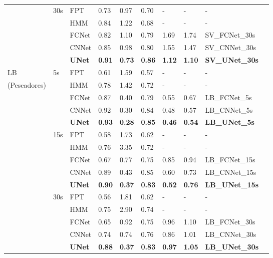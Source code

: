 \documentclass{article}
\begin{document}
\begin{table}[h]
\begin{tabular}{llllllllll}
             & 30s & FPT    & 0.73 & 0.97 & 0.70 &  - & - & - \\
             &     & HMM    & 0.84 & 1.22 & 0.68 & - & - & - \\
             &     & FCNet  & 0.82 & 1.10 & 0.79 & 1.69 & 1.74 & SV\_FCNet\_30s \\
             &     & CNNet  & 0.85 & 0.98 & 0.80 & 1.55 & 1.47 & SV\_CNNet\_30s \\
             &     & {\bf UNet} & {\bf 0.91} & {\bf 0.73} & {\bf 0.86} & {\bf 1.12} & {\bf 1.10} & {\bf SV\_UNet\_30s} \\
    \midrule
    LB        & 5s  & FPT    & 0.61 & 1.59 & 0.57 & - & - & - \\
(Pescadores) &     & HMM    & 0.78 & 1.42 & 0.72 & - & - & - \\
             &     & FCNet  & 0.87 & 0.40 & 0.79 & 0.55 & 0.67 & LB\_FCNet\_5s \\
             &     & CNNet  & 0.92 & 0.30 & 0.84 & 0.48 & 0.57 & LB\_CNNet\_5s \\
             &     & {\bf UNet} & {\bf 0.93} & {\bf 0.28} & {\bf 0.85} & {\bf 0.46} & {\bf 0.54} & {\bf LB\_UNet\_5s} \\
             & 15s & FPT    & 0.58 & 1.73 & 0.62 & - & - & - \\
             &     & HMM    & 0.76 & 3.35 & 0.72 & - & - & - \\
             &     & FCNet  & 0.67 & 0.77 & 0.75 & 0.85 & 0.94 & LB\_FCNet\_15s \\
             &     & CNNet  & 0.89 & 0.43 & 0.85 & 0.60 & 0.73 & LB\_CNNet\_15s \\
             &     & {\bf UNet} & {\bf 0.90} & {\bf 0.37} & {\bf 0.83} & {\bf 0.52}& {\bf 0.76} & {\bf LB\_UNet\_15s} \\
             & 30s & FPT    & 0.56 & 1.81 & 0.62 & - & - & - \\
             &     & HMM    & 0.75 & 2.90 & 0.74 & - & - & - \\
             &     & FCNet  & 0.65 & 0.92 & 0.75 & 0.96 & 1.10 & LB\_FCNet\_30s \\
             &     & CNNet  & 0.74 & 0.74 & 0.76 & 0.86 & 1.01 & LB\_CNNet\_30s\\
             &     & {\bf UNet} & {\bf 0.88} & {\bf 0.37} & {\bf 0.83} & {\bf 0.97} & {\bf 1.05} & {\bf LB\_UNet\_30s} \\
    \bottomrule
  \end{tabular}
  \label{table_training}
\end{table}
\end{document}
